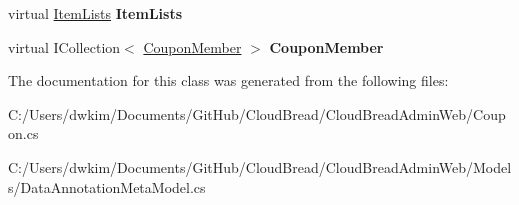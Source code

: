 \begin{DoxyCompactItemize}
\item 
virtual \hyperlink{class_cloud_bread_admin_web_1_1_item_lists}{Item\+Lists} {\bfseries Item\+Lists}\hypertarget{class_cloud_bread_admin_web_1_1_coupon_abbdc48bad1a549486f69865e50507467}{}\label{class_cloud_bread_admin_web_1_1_coupon_abbdc48bad1a549486f69865e50507467}

\item 
virtual I\+Collection$<$ \hyperlink{class_cloud_bread_admin_web_1_1_coupon_member}{Coupon\+Member} $>$ {\bfseries Coupon\+Member}\hypertarget{class_cloud_bread_admin_web_1_1_coupon_a817e450441acc539f1a1cd482feca6fc}{}\label{class_cloud_bread_admin_web_1_1_coupon_a817e450441acc539f1a1cd482feca6fc}

\end{DoxyCompactItemize}


The documentation for this class was generated from the following files\+:\begin{DoxyCompactItemize}
\item 
C\+:/\+Users/dwkim/\+Documents/\+Git\+Hub/\+Cloud\+Bread/\+Cloud\+Bread\+Admin\+Web/Coupon.\+cs\item 
C\+:/\+Users/dwkim/\+Documents/\+Git\+Hub/\+Cloud\+Bread/\+Cloud\+Bread\+Admin\+Web/\+Models/Data\+Annotation\+Meta\+Model.\+cs\end{DoxyCompactItemize}

